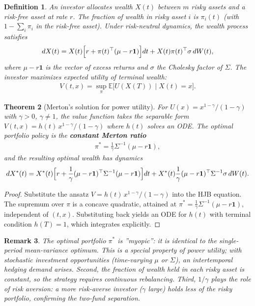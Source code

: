 \documentclass{report}
\theoremstyle{spacedplain}
\newtheorem{theorem}{Theorem}[section]
\theoremstyle{spaceddefinition}
\newtheorem{definition}[theorem]{Definition}
\theoremstyle{spacedremark}
\newtheorem{remark}[theorem]{Remark}
\begin{document}
\begin{definition}
An investor allocates wealth $X(t)$ between $m$ risky assets and a risk-free asset at rate $r$. The fraction of wealth in risky asset $i$ is $\pi_i(t)$ (with $1-\sum_i\pi_i$ in the risk-free asset). Under risk-neutral dynamics, the wealth process satisfies
\begin{align}
    dX(t) = X(t)\Bigl[r + \pi(t)^\top(\mu - r\mathbf{1})\Bigr]dt
    + X(t)\pi(t)^\top\sigma\,dW(t),
\end{align}
where $\mu - r\mathbf{1}$ is the vector of excess returns and $\sigma$ the Cholesky factor of $\Sigma$. The investor maximizes expected utility of terminal wealth:
\begin{align}
    V(t,x) = \sup_{\pi} \mathbb{E}\bigl[U(X(T))\;\big|\;X(t) = x\bigr].
\end{align}
\end{definition}
 
\begin{theorem}[Merton's solution for power utility]
For $U(x) = x^{1-\gamma}/(1-\gamma)$ with $\gamma > 0$, $\gamma \neq 1$, the value function takes the separable form $V(t,x) = h(t)\,x^{1-\gamma}/(1-\gamma)$ where $h(t)$ solves an ODE. The optimal portfolio policy is the \textbf{constant Merton ratio}
\begin{align}
    \pi^* = \frac{1}{\gamma}\Sigma^{-1}(\mu - r\mathbf{1}),
\end{align}
and the resulting optimal wealth has dynamics
\begin{align}
    dX^*(t) = X^*(t)\Bigl[r + \frac{1}{\gamma}(\mu-r\mathbf{1})^\top
    \Sigma^{-1}(\mu-r\mathbf{1})\Bigr]dt
    + X^*(t)\frac{1}{\gamma}(\mu-r\mathbf{1})^\top\Sigma^{-1}\sigma\,dW(t).
\end{align}
\end{theorem}
 
\begin{proof}
Substitute the ansatz $V = h(t)\,x^{1-\gamma}/(1-\gamma)$ into the HJB equation. The supremum over $\pi$ is a concave quadratic, attained at $\pi^* = \frac{1}{\gamma}\Sigma^{-1}(\mu-r\mathbf{1})$, independent of $(t,x)$. Substituting back yields an ODE for $h(t)$ with terminal condition $h(T) = 1$, which integrates explicitly.
\end{proof}
 
\begin{remark}
The optimal portfolio $\pi^*$ is ''myopic'': it is identical to the single-period mean-variance optimum. This is a special property of power utility; with stochastic investment opportunities (time-varying $\mu$ or $\Sigma$), an
intertemporal hedging demand arises. Second, the fraction of wealth held in each risky asset is constant, so the strategy requires continuous rebalancing. Third, $1/\gamma$ plays the role of risk aversion: a more risk-averse investor
($\gamma$ large) holds less of the risky portfolio, confirming the two-fund separation.
\end{remark}
 
\end{document}
